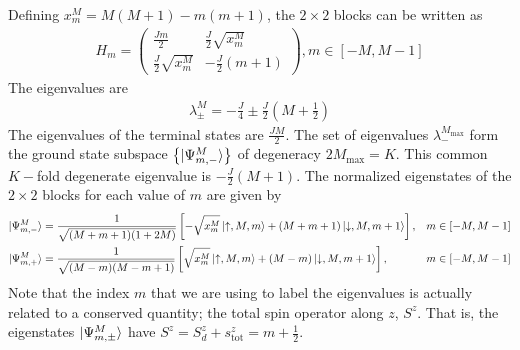 \documentclass[12pt]{revtex4-2}
\begin{document}
Defining \(x^M_m = M(M+1) - m(m+1)\), the \(2\times 2\) blocks can be written as
\begin{align}
	H_m = \begin{pmatrix} \frac{Jm}{2} & \frac{J}{2}\sqrt{x^M_m} \\ \frac{J}{2}\sqrt{x^M_m} & -\frac{J}{2}(m+1) \end{pmatrix} , m \in \left[-M, M-1\right] 
\end{align}
The eigenvalues are 
\begin{align}
	\lambda_{\pm}^{M} = - \frac{J}{4} \pm \frac{J}{2}\left(M + \frac{1}{2}\right) 
\end{align}
The eigenvalues of the terminal states are \(\frac{JM}{2}\). The set of eigenvalues \(\lambda^{M_\text{max}}_-\) form the ground state subspace \(\left\{ \ket{\Psi^M_{m,-}} \right\} \) of degeneracy \(2M_\text{max} = K\). This common \(K-\)fold degenerate eigenvalue is \(-\frac{J}{2}(M+1)\).
The normalized eigenstates of the \(2\times 2\) blocks for each value of \(m\) are given by
\begin{align}
	\ket{\Psi^M_{m,-}} &= \frac{1}{\sqrt{(M+m+1)(1+2M)}}\left[-\sqrt{x_m^M}\ket{\uparrow, M, m} + \left(M + m + 1\right)\ket{\downarrow,M,m+1}\right],& m \in \left[-M, M-1\right] \\
	\ket{\Psi^M_{m,+}} &= \frac{1}{\sqrt{(M -m)(M - m + 1)}}\left[\sqrt{x_m^M}\ket{\uparrow, M, m} + \left(M - m\right)\ket{\downarrow,M,m+1}\right],& m \in \left[-M, M-1\right]
\end{align}
Note that the index \(m\) that we are using to label the eigenvalues is actually related to a conserved quantity; the total spin operator along \(z\), \(S^z\). That is, the eigenstates \(\ket{\Psi^M_{m,\pm}}\) have \(S^z = S_d^z + s_\text{tot}^z = m + \frac{1}{2}\).
\end{document}
